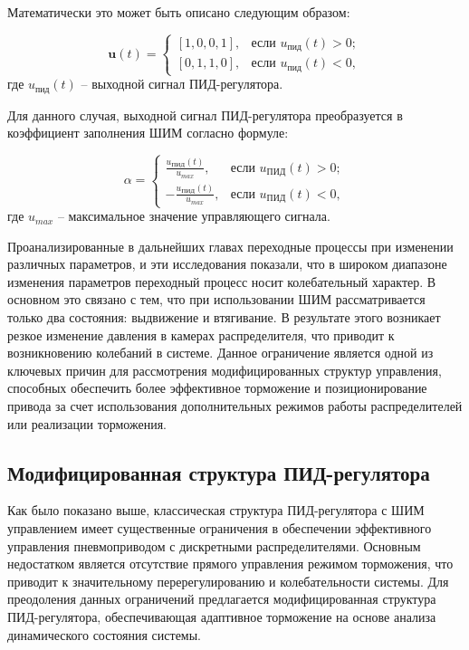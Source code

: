 Математически это может быть описано следующим образом:

\begin{equation}
	\mathbf{u}(t) = \begin{cases}
		[1,0,0,1], & \text{если } u_\text{пид}(t) > 0; \\
		[0,1,1,0], & \text{если } u_\text{пид}(t) < 0,
	\end{cases}
\end{equation}
где $u_\text{пид}(t)$ -- выходной сигнал ПИД-регулятора.

Для данного случая, выходной сигнал ПИД-регулятора
преобразуется в коэффициент заполнения ШИМ согласно формуле:

\begin{equation}
	\alpha = \begin{cases}
		\frac{u_\text{ПИД}(t)}{u_{max}},  & \text{если } u_\text{ПИД}(t) > 0; \\
		-\frac{u_\text{ПИД}(t)}{u_{max}}, & \text{если } u_\text{ПИД}(t) < 0,
	\end{cases}
\end{equation}
где $u_{max}$ -- максимальное значение управляющего сигнала.

Проанализированные в дальнейших главах переходные процессы при изменении различных
параметров, и эти исследования показали, что в широком диапазоне
изменения параметров переходный процесс носит колебательный характер. В основном это связано с
тем, что при использовании ШИМ рассматривается только два состояния: выдвижение и втягивание.
В результате этого возникает резкое изменение давления в камерах распределителя, что приводит к возникновению
колебаний в системе. Данное ограничение является одной из ключевых причин для рассмотрения модифицированных
структур управления, способных обеспечить более эффективное торможение и позиционирование
привода за счет использования дополнительных режимов работы распределителей или реализации
торможения.

\subsection*{Модифицированная структура ПИД-регулятора}\label{subsec:ch3/sec2/sub3}

Как было показано выше, классическая структура ПИД-регулятора с ШИМ управлением имеет
существенные ограничения в обеспечении эффективного управления пневмоприводом с
дискретными распределителями. Основным недостатком является отсутствие прямого управления режимом торможения,
что приводит к значительному перерегулированию и колебательности системы. Для преодоления данных ограничений
предлагается модифицированная структура ПИД-регулятора, обеспечивающая адаптивное торможение на основе анализа динамического состояния системы.

